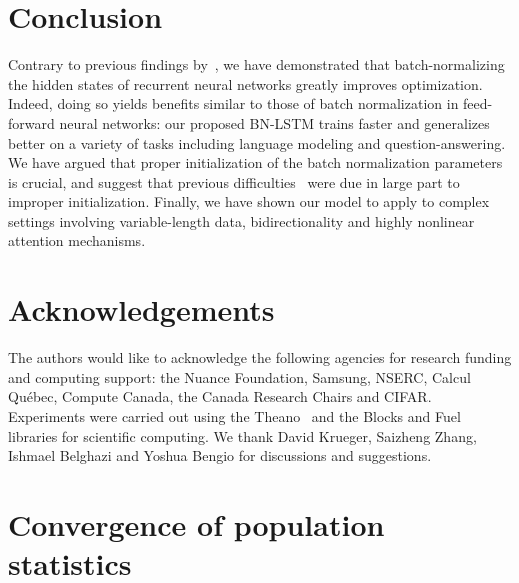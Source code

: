 \documentclass{article} %
\begin{document}
\section{Conclusion}

Contrary to previous findings by~\citet{cesar,baidu}, we have demonstrated that
batch-normalizing the hidden states of recurrent neural networks greatly
improves optimization.  Indeed, doing so yields benefits similar to those of
batch normalization in feed-forward neural networks: our proposed BN-LSTM
trains faster and generalizes better on a variety of tasks including language
modeling and question-answering.  We have argued that proper initialization of
the batch normalization parameters is crucial, and suggest that previous
difficulties~\citep{cesar, baidu} were due in large part to improper
initialization.  Finally, we have shown our model to apply to complex settings
involving variable-length data, bidirectionality and highly nonlinear attention
mechanisms.

\section*{Acknowledgements}

The authors would like to acknowledge the following agencies for
research funding and computing support: the Nuance Foundation, Samsung, NSERC, Calcul Qu\'{e}bec, Compute Canada,
the Canada Research Chairs and CIFAR.
Experiments were carried out using the Theano~\citep{theano} and the
Blocks and Fuel~\citep{blocks} libraries for scientific computing.
We thank David Krueger, Saizheng Zhang, Ishmael Belghazi and Yoshua Bengio for discussions and suggestions.




\newpage

\appendix

\section{Convergence of population statistics} \label{sec:popstat_stationarity}
\end{document}
